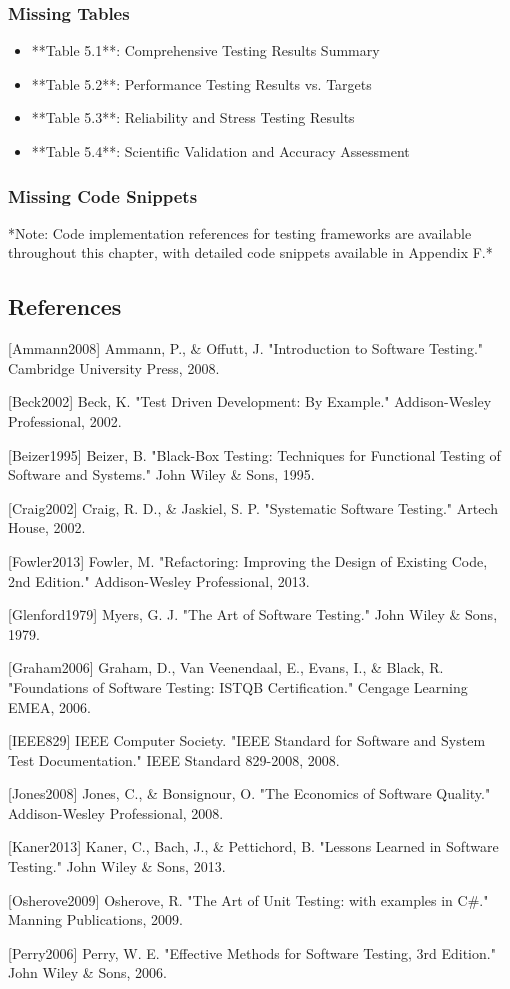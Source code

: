 \documentclass[12pt,a4paper]{article}
\begin{document}
\subsubsection{Missing Tables}

\begin{itemize}
\item **Table 5.1**: Comprehensive Testing Results Summary
\item **Table 5.2**: Performance Testing Results vs. Targets
\item **Table 5.3**: Reliability and Stress Testing Results
\item **Table 5.4**: Scientific Validation and Accuracy Assessment

\end{itemize}
\subsubsection{Missing Code Snippets}

*Note: Code implementation references for testing frameworks are available throughout this chapter, with detailed code
snippets available in Appendix F.*

\subsection{References}

[Ammann2008] Ammann, P., \& Offutt, J. "Introduction to Software Testing." Cambridge University Press, 2008.

[Beck2002] Beck, K. "Test Driven Development: By Example." Addison-Wesley Professional, 2002.

[Beizer1995] Beizer, B. "Black-Box Testing: Techniques for Functional Testing of Software and Systems." John Wiley \&
Sons, 1995.

[Craig2002] Craig, R. D., \& Jaskiel, S. P. "Systematic Software Testing." Artech House, 2002.

[Fowler2013] Fowler, M. "Refactoring: Improving the Design of Existing Code, 2nd Edition." Addison-Wesley Professional,
2013.

[Glenford1979] Myers, G. J. "The Art of Software Testing." John Wiley \& Sons, 1979.

[Graham2006] Graham, D., Van Veenendaal, E., Evans, I., \& Black, R. "Foundations of Software Testing: ISTQB
Certification." Cengage Learning EMEA, 2006.

[IEEE829] IEEE Computer Society. "IEEE Standard for Software and System Test Documentation." IEEE Standard 829-2008,
2008.

[Jones2008] Jones, C., \& Bonsignour, O. "The Economics of Software Quality." Addison-Wesley Professional, 2008.

[Kaner2013] Kaner, C., Bach, J., \& Pettichord, B. "Lessons Learned in Software Testing." John Wiley \& Sons, 2013.

[Osherove2009] Osherove, R. "The Art of Unit Testing: with examples in C\#." Manning Publications, 2009.

[Perry2006] Perry, W. E. "Effective Methods for Software Testing, 3rd Edition." John Wiley \& Sons, 2006.
\end{document}
